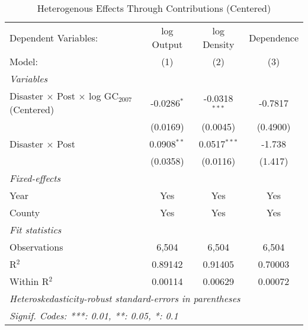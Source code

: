 
\begin{table}[htbp]
   \caption{Heterogenous Effects Through Contributions (Centered)}
   \centering
   \begin{adjustbox}{max width = \textwidth, center}
      \begin{tabular}{lccc}
         \tabularnewline \midrule \midrule
         Dependent Variables:                                         & log Output    & log Density     & Dependence\\  
         Model:                                                       & (1)           & (2)             & (3)\\  
         \midrule
         \emph{Variables}\\
         Disaster $\times$ Post $\times$ log GC$_{2007}$ (Centered)   & -0.0286$^{*}$ & -0.0318$^{***}$ & -0.7817\\   
                                                                      & (0.0169)      & (0.0045)        & (0.4900)\\   
         Disaster $\times$ Post                                       & 0.0908$^{**}$ & 0.0517$^{***}$  & -1.738\\   
                                                                      & (0.0358)      & (0.0116)        & (1.417)\\   
         \midrule
         \emph{Fixed-effects}\\
         Year                                                         & Yes           & Yes             & Yes\\  
         County                                                       & Yes           & Yes             & Yes\\  
         \midrule
         \emph{Fit statistics}\\
         Observations                                                 & 6,504         & 6,504           & 6,504\\  
         R$^2$                                                        & 0.89142       & 0.91405         & 0.70003\\  
         Within R$^2$                                                 & 0.00114       & 0.00629         & 0.00072\\  
         \midrule \midrule
         \multicolumn{4}{l}{\emph{Heteroskedasticity-robust standard-errors in parentheses}}\\
         \multicolumn{4}{l}{\emph{Signif. Codes: ***: 0.01, **: 0.05, *: 0.1}}\\
      \end{tabular}
   \end{adjustbox}
\end{table}


